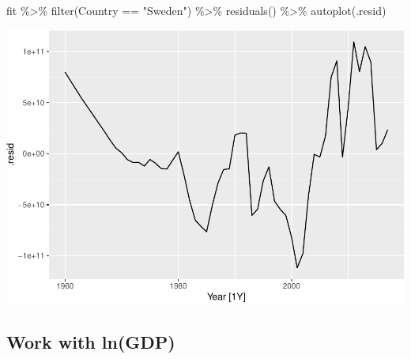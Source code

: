 \documentclass[
]{book}
\newenvironment{Shaded}{\begin{snugshade}}{\end{snugshade}}
\newcommand{\FunctionTok}[1]{\textcolor[rgb]{0.00,0.00,0.00}{#1}}
\newcommand{\NormalTok}[1]{#1}
\newcommand{\SpecialCharTok}[1]{\textcolor[rgb]{0.00,0.00,0.00}{#1}}
\newcommand{\StringTok}[1]{\textcolor[rgb]{0.31,0.60,0.02}{#1}}
\begin{document}
\begin{Shaded}
\begin{Highlighting}[]
\NormalTok{fit }\SpecialCharTok{\%\textgreater{}\%} \FunctionTok{filter}\NormalTok{(Country }\SpecialCharTok{==} \StringTok{"Sweden"}\NormalTok{) }\SpecialCharTok{\%\textgreater{}\%} \FunctionTok{residuals}\NormalTok{() }\SpecialCharTok{\%\textgreater{}\%} \FunctionTok{autoplot}\NormalTok{(.resid)}
\end{Highlighting}
\end{Shaded}

\includegraphics{graphics/unnamed-chunk-28-1.pdf}

\hypertarget{work-with-lngdp}{%
\subsection{Work with ln(GDP)}\label{work-with-lngdp}}

\begin{Shaded}
\end{Shaded}
\end{document}
